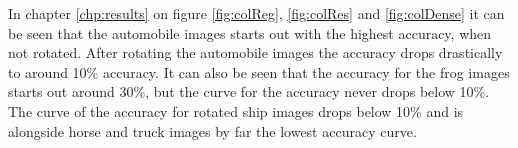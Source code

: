 In chapter \ref{chp:results} on figure \ref{fig:colReg}, \ref{fig:colRes} and \ref{fig:colDense} it can be seen that the automobile images starts out with the highest accuracy, when not rotated. After rotating the automobile images the accuracy drops drastically to around 10\% accuracy. It can also be seen that the accuracy for the frog images starts out around 30\%, but the curve for the accuracy never drops below 10\%. The curve of the accuracy for rotated ship images drops below 10\% and is alongside horse and truck images by far the lowest accuracy curve.